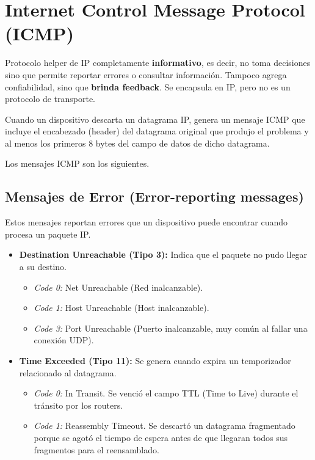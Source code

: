 \section{Internet Control Message Protocol (ICMP)}

Protocolo helper de IP completamente \textbf{informativo}, es decir, no toma decisiones sino que permite reportar errores o consultar información. Tampoco agrega confiabilidad, sino que \textbf{brinda feedback}. Se encapsula en IP, pero no es un protocolo de transporte.


Cuando un dispositivo descarta un datagrama IP, genera un mensaje ICMP que incluye el encabezado (header) del datagrama original que produjo el problema y al menos los primeros 8 bytes del campo de datos de dicho datagrama.

Los mensajes ICMP son los siguientes.

\subsection{Mensajes de Error (Error-reporting messages)}
Estos mensajes reportan errores que un dispositivo puede encontrar cuando procesa un paquete IP.

\begin{itemize}[label=\textcolor{acento}{$\bullet$}]
    \item \textbf{Destination Unreachable (Tipo 3):} Indica que el paquete no pudo llegar a su destino.
    \begin{itemize}[label=\textcolor{acento!60}{$\bullet$}]
        \item \textit{Code 0:} Net Unreachable (Red inalcanzable).
        \item \textit{Code 1:} Host Unreachable (Host inalcanzable).
        \item \textit{Code 3:} Port Unreachable (Puerto inalcanzable, muy común al fallar una conexión UDP).
    \end{itemize}
    
    \item \textbf{Time Exceeded (Tipo 11):} Se genera cuando expira un temporizador relacionado al datagrama.
    \begin{itemize}[label=\textcolor{acento!60}{$\bullet$}]
        \item \textit{Code 0:} In Transit. Se venció el campo TTL (Time to Live) durante el tránsito por los routers.
        \item \textit{Code 1:} Reassembly Timeout. Se descartó un datagrama fragmentado porque se agotó el tiempo de espera antes de que llegaran todos sus fragmentos para el reensamblado.
    \end{itemize}
\end{itemize}

